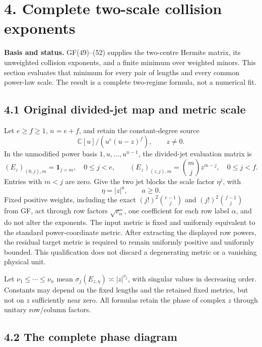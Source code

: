 \documentclass[
  11pt,
]{article}
\begin{document}
\newpage

\section{4. Complete two-scale collision
exponents}\label{complete-two-scale-collision-exponents}

\textbf{Basis and status.} GF(49)--(52) supplies the two-centre Hermite
matrix, its unweighted collision exponents, and a finite minimum over
weighted minors. This section evaluates that minimum for every pair of
lengths and every common power-law scale. The result is a complete
two-regime formula, not a numerical fit.

\subsection{4.1 Original divided-jet map and metric
scale}\label{original-divided-jet-map-and-metric-scale}

Let \(e\ge f\ge1\), \(n=e+f\), and retain the constant-degree source \[
\mathbb C[u]/(u^e(u-z)^f),\qquad z\ne0.
\] In the unmodified power basis \(1,u,\ldots,u^{n-1}\), the divided-jet
evaluation matrix is \[
(E_z)_{(0,j),m}=\mathbf1_{j=m},\quad 0\le j<e,
\qquad
(E_z)_{(z,j),m}=\binom mjz^{m-j},\quad0\le j<f.
\tag{CP1}
\] Entries with \(m<j\) are zero. Give the two jet blocks the scale
factor \(\eta^j\), with \[
\eta=|z|^a,\qquad a\ge0.
\] Fixed positive weights, including the exact \((j!)^2\binom{e-1}j\)
and \((j!)^2\binom{f-1}j\) from GF, act through row factors
\(\sqrt{c_\alpha}\), one coefficient for each row label \(\alpha\), and
do not alter the exponents. The input metric is fixed and uniformly
equivalent to the standard power-coordinate metric. After extracting the
displayed row powers, the residual target metric is required to remain
uniformly positive and uniformly bounded. This qualification does not
discard a degenerating metric or a vanishing physical unit.

Let \(\nu_1\le\cdots\le\nu_n\) mean
\(\sigma_j(E_{z,\eta})\asymp |z|^{\nu_j}\), with singular values in
decreasing order. Constants may depend on the fixed lengths and the
retained fixed metrics, but not on \(z\) sufficiently near zero. All
formulas retain the phase of complex \(z\) through unitary row/column
factors.

\subsection{4.2 The complete phase
diagram}\label{the-complete-phase-diagram}
\end{document}
